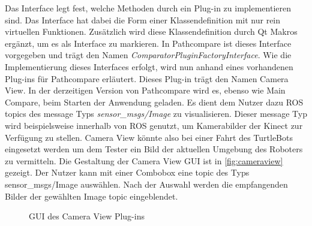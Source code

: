 Das Interface legt fest, welche
Methoden durch ein Plug-in zu implementieren sind. Das Interface hat dabei die
Form einer Klassendefinition mit nur rein virtuellen Funktionen. Zusätzlich
wird diese Klassendefinition durch Qt Makros ergänzt, um es als Interface zu
markieren. In Pathcompare ist dieses Interface vorgegeben und trägt den Namen
\textit{ComparatorPluginFactoryInterface}. Wie die Implementierung dieses
Interfaces erfolgt, wird nun anhand eines vorhandenen Plug-ins für Pathcompare
erläutert. Dieses Plug-in trägt den Namen Camera View. In der derzeitigen
Version von Pathcompare wird es, ebenso wie Main Compare, beim Starten der
Anwendung geladen. Es dient dem Nutzer dazu ROS topics des message Typs
\textit{sensor\_msgs/Image} zu visualisieren. Dieser message Typ wird
beispielsweise innerhalb von ROS genutzt, um Kamerabilder der Kinect zur
Verfügung zu stellen.  Camera View könnte also bei einer Fahrt des TurtleBots
eingesetzt werden um dem Tester ein Bild der aktuellen Umgebung des Roboters zu
vermitteln. Die Gestaltung der Camera View GUI ist in \autoref{fig:cameraview}
gezeigt.  Der Nutzer kann mit einer Combobox eine topic des Typs
sensor\_msgs/Image auswählen. Nach der Auswahl werden die empfangenden Bilder
der gewählten Image topic eingeblendet. 

\begin{figure}[t]
  \begin{center}
  \end{center}
  \caption{GUI des Camera View Plug-ins}
  \label{fig:cameraview}
\end{figure}

